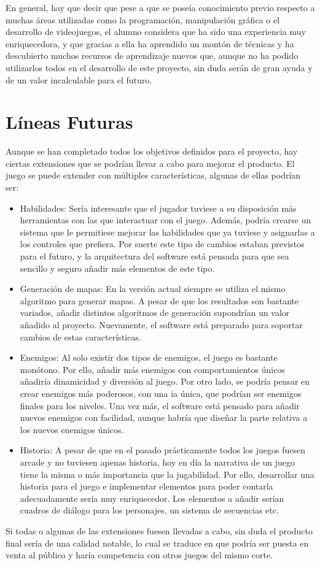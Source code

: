 	En general, hay que decir que pese a que se poseía conocimiento previo respecto a muchas áreas utilizadas como la programación, manipulación gráfica o el desarrollo de videojuegos, el alumno considera que ha sido una experiencia muy enriquecedora, y que gracias a ella ha aprendido un montón de técnicas y ha descubierto muchos recursos de aprendizaje nuevos que, aunque no ha podido utilizarlos todos en el desarrollo de este proyecto, sin duda serán de gran ayuda y de un valor incalculable para el futuro.

\section{Líneas Futuras}

	Aunque se han completado todos los objetivos definidos para el proyecto, hay ciertas extensiones que se podrían llevar a cabo para mejorar el producto. El juego se puede extender con múltiples características, algunas de ellas podrían ser:

	\begin{itemize}

		\item Habilidades: Sería interesante que el jugador tuviese a su disposición más herramientas con las que interactuar con el juego. Además, podría crearse un sistema que le permitiese mejorar las habilidades que ya tuviese y asignarlas a los controles que prefiera. Por suerte este tipo de cambios estaban previstos para el futuro, y la arquitectura del software está pensada para que sea sencillo y seguro añadir más elementos de este tipo.

		\item Generación de mapas: En la versión actual siempre se utiliza el mismo algoritmo para generar mapas. A pesar de que los resultados son bastante variados, añadir distintos algoritmos de generación supondrían un valor añadido al proyecto. Nuevamente, el software está preparado para soportar cambios de estas características.

		\item Enemigos: Al solo existir dos tipos de enemigos, el juego es bastante monótono. Por ello, añadir más enemigos con comportamientos únicos añadiría dinamicidad y diversión al juego. Por otro lado, se podría pensar en crear enemigos más poderosos, con una \acrshort{ia} única, que podrían ser enemigos finales para los niveles. Una vez más, el software está pensado para añadir nuevos enemigos con facilidad, aunque habría que diseñar la parte relativa a los nuevos enemigos únicos.

		\item Historia: A pesar de que en el pasado prácticamente todos los juegos fuesen arcade y no tuviesen apenas historia, hoy en día la narrativa de un juego tiene la misma o más importancia que la jugabilidad. Por ello, desarrollar una historia para el juego e implementar elementos para poder contarla adecuadamente sería muy enriquecedor. Los elementos a añadir serían cuadros de diálogo para los personajes, un sistema de secuencias etc.

	\end{itemize}

	Si todas o algunas de las extensiones fuesen llevadas a cabo, sin duda el producto final sería de una calidad notable, lo cual se traduce en que podría ser puesta en venta al público y haría competencia con otros juegos del mismo corte.
	